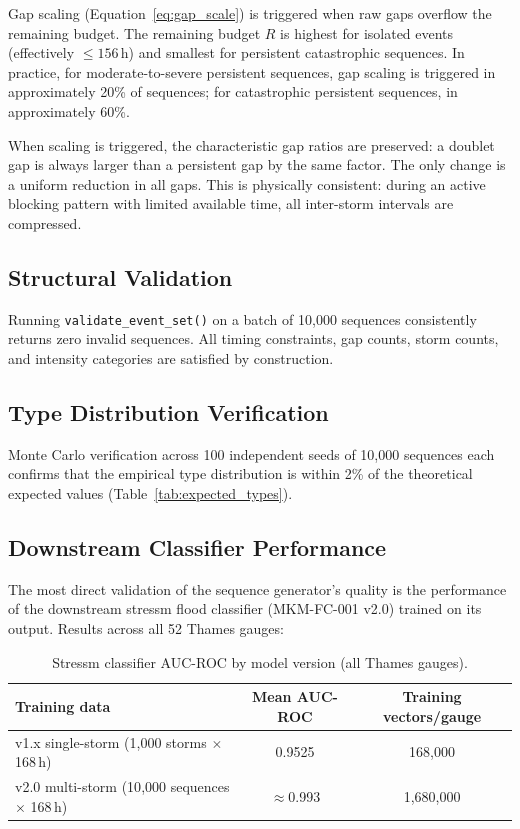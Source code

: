 \documentclass[11pt,a4paper]{article}
\begin{document}
Gap scaling (Equation~\ref{eq:gap_scale}) is triggered when raw gaps overflow the
remaining budget. The remaining budget $R$ is highest for isolated events (effectively
$\leq 156\,\text{h}$) and smallest for persistent catastrophic sequences. In practice,
for moderate-to-severe persistent sequences, gap scaling is triggered in approximately
20\% of sequences; for catastrophic persistent sequences, in approximately 60\%.

When scaling is triggered, the characteristic gap ratios are preserved: a doublet gap
is always larger than a persistent gap by the same factor. The only change is a uniform
reduction in all gaps. This is physically consistent: during an active blocking pattern
with limited available time, all inter-storm intervals are compressed.

\mkmvalidation

\subsection{Structural Validation}

Running \texttt{validate\_event\_set()} on a batch of 10{,}000 sequences consistently
returns zero invalid sequences. All timing constraints, gap counts, storm counts,
and intensity categories are satisfied by construction.

\subsection{Type Distribution Verification}

Monte Carlo verification across 100 independent seeds of 10{,}000 sequences each
confirms that the empirical type distribution is within 2\% of the theoretical
expected values (Table~\ref{tab:expected_types}).

\subsection{Downstream Classifier Performance}

The most direct validation of the sequence generator's quality is the performance
of the downstream stressm flood classifier (MKM-FC-001 v2.0) trained on its output.
Results across all 52 Thames gauges:

\begin{table}[H]
  \centering
  \caption{Stressm classifier AUC-ROC by model version (all Thames gauges).}
  \label{tab:classifier_improvement}
  \begin{tabular}{lcc}
    \toprule
    \textbf{Training data} & \textbf{Mean AUC-ROC} & \textbf{Training vectors/gauge} \\
    \midrule
    v1.x single-storm (1{,}000 storms $\times$ 168\,h)    & 0.9525 & 168{,}000 \\
    v2.0 multi-storm (10{,}000 sequences $\times$ 168\,h) & $\approx$0.993 & 1{,}680{,}000 \\
    \bottomrule
  \end{tabular}
\end{table}
\end{document}

